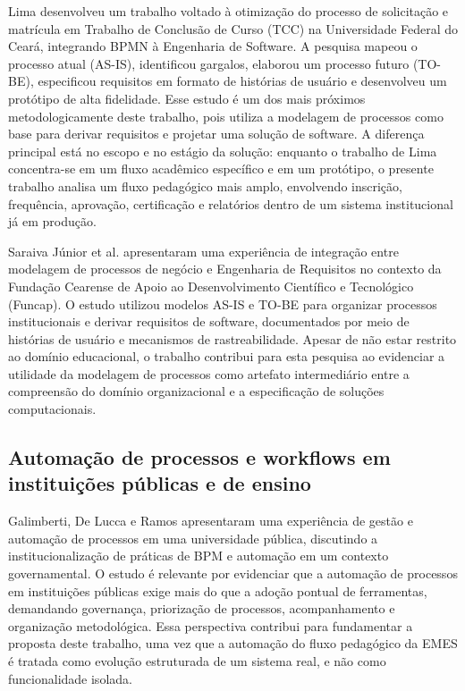 Lima \cite{Lima2026} desenvolveu um trabalho voltado à otimização do processo de solicitação e matrícula em Trabalho de Conclusão de Curso (TCC) na Universidade Federal do Ceará, integrando BPMN à Engenharia de Software. A pesquisa mapeou o processo atual (AS-IS), identificou gargalos, elaborou um processo futuro (TO-BE), especificou requisitos em formato de histórias de usuário e desenvolveu um protótipo de alta fidelidade. Esse estudo é um dos mais próximos metodologicamente deste trabalho, pois utiliza a modelagem de processos como base para derivar requisitos e projetar uma solução de software. A diferença principal está no escopo e no estágio da solução: enquanto o trabalho de Lima concentra-se em um fluxo acadêmico específico e em um protótipo, o presente trabalho analisa um fluxo pedagógico mais amplo, envolvendo inscrição, frequência, aprovação, certificação e relatórios dentro de um sistema institucional já em produção.

Saraiva Júnior et al. \cite{SaraivaJuniorEtAl2025} apresentaram uma experiência de integração entre modelagem de processos de negócio e Engenharia de Requisitos no contexto da Fundação Cearense de Apoio ao Desenvolvimento Científico e Tecnológico (Funcap). O estudo utilizou modelos AS-IS e TO-BE para organizar processos institucionais e derivar requisitos de software, documentados por meio de histórias de usuário e mecanismos de rastreabilidade. Apesar de não estar restrito ao domínio educacional, o trabalho contribui para esta pesquisa ao evidenciar a utilidade da modelagem de processos como artefato intermediário entre a compreensão do domínio organizacional e a especificação de soluções computacionais.

\subsection{Automação de processos e workflows em instituições públicas e de ensino}
\label{sec:trabalhos-relacionados:automacao-workflows}

Galimberti, De Lucca e Ramos \cite{GalimbertiLuccaRamos2024} apresentaram uma experiência de gestão e automação de processos em uma universidade pública, discutindo a institucionalização de práticas de BPM e automação em um contexto governamental. O estudo é relevante por evidenciar que a automação de processos em instituições públicas exige mais do que a adoção pontual de ferramentas, demandando governança, priorização de processos, acompanhamento e organização metodológica. Essa perspectiva contribui para fundamentar a proposta deste trabalho, uma vez que a automação do fluxo pedagógico da EMES é tratada como evolução estruturada de um sistema real, e não como funcionalidade isolada.

